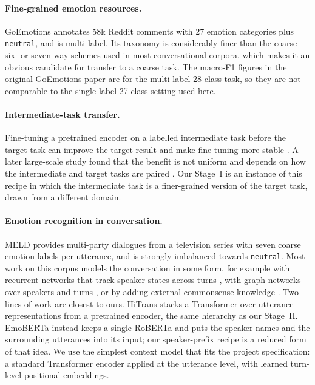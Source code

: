 \documentclass[sigconf,nonacm]{acmart}
\begin{document}
\paragraph{Fine-grained emotion resources.}
GoEmotions \citep{demszky2020goemotions} annotates 58k Reddit comments with 27 emotion
categories plus \texttt{neutral}, and is multi-label. Its taxonomy is considerably finer
than the coarse six- or seven-way schemes used in most conversational corpora, which makes
it an obvious candidate for transfer to a coarse task. The macro-F1 figures in the original
GoEmotions paper are for the multi-label 28-class task, so they are not comparable to the single-label 27-class setting used
here.

\paragraph{Intermediate-task transfer.}
Fine-tuning a pretrained encoder on a labelled intermediate task before the target task
can improve the target result and make fine-tuning more stable \citep{phang2018stilts}. A
later large-scale study found that the benefit is not uniform and depends on how the
intermediate and target tasks are paired \citep{pruksachatkun2020intermediate}. Our Stage~I
is an instance of this recipe in which the intermediate task is a finer-grained version of
the target task, drawn from a different domain.

\paragraph{Emotion recognition in conversation.}
MELD \citep{poria2019meld} provides multi-party dialogues from a television series with
seven coarse emotion labels per utterance, and is strongly imbalanced towards
\texttt{neutral}. Most work on this corpus models the conversation in some form, for
example with recurrent networks that track speaker states across turns
\citep{majumder2018dialoguernn}, with graph networks over speakers and turns
\citep{ghosal2019dialoguegcn}, or by adding external commonsense knowledge
\citep{ghosal2020cosmic}. Two lines of work are closest to ours. HiTrans
\citep{li2020hitrans} stacks a Transformer over utterance representations from a pretrained
encoder, the same hierarchy as our Stage~II. EmoBERTa \citep{kim2021emoberta} instead keeps
a single RoBERTa and puts the speaker names and the surrounding utterances into its input;
our speaker-prefix recipe is a reduced form of that idea. We use the simplest context model
that fits the project specification: a standard Transformer encoder
\citep{vaswani2017attention} applied at the utterance level, with learned turn-level
positional embeddings.
\end{document}
